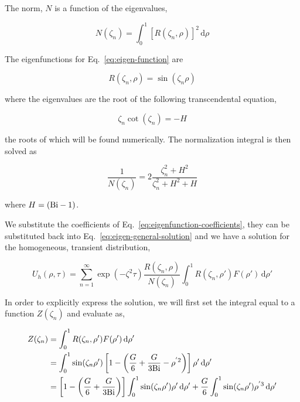 The norm, $N$ is a function of the eigenvalues,

\begin{equation}
    N(\zeta_n) = \int_0^1 \left[R(\zeta_n,\rho)\right]^2\,\mathrm{d}\rho
\end{equation}



The eigenfunctions for Eq.~\ref{eq:eigen-function} are

\begin{equation}
    R(\zeta_n,\rho) = \sin(\zeta_n \rho)
\end{equation}

where the eigenvalues are the root of the following transcendental equation,

\begin{equation}
    \zeta_n\cot(\zeta_n) = -H
\end{equation}

the roots of which will be found numerically. The normalization integral is then solved as

\begin{equation}
    \frac{1}{N(\zeta_n)} = 2\frac{\zeta_n^2 + H^2}{\zeta_n^2+H^2 + H}
\end{equation}

where $H = (\mathrm{Bi}-1)$. 

We substitute the coefficients of Eq.~\ref{eq:eigenfunction-coefficients}, they can be substituted back into Eq.~\ref{eq:eigen-general-solution} and we have a solution for the homogeneous, transient distribution,

\begin{equation}
    U_h(\rho,\tau) = \sum_{n=1}^\infty \exp(-\zeta^2 \tau) \frac{R(\zeta_n,\rho)}{N(\zeta_n)}\int_0^1 R(\zeta_n,\rho')F(\rho')\,\mathrm{d}\rho'
\end{equation}

In order to explicitly express the solution, we will first set the integral equal to a function $Z(\zeta_n)$ and evaluate as,

\begin{align}
    Z(\zeta_n) & = \int_0^1 R(\zeta_n,\rho')F(\rho')\,\mathrm{d}\rho' \nonumber\\
    & = \int_0^1\sin(\zeta_n\rho') \left[1 - \left(\frac{G}{6} + \frac{G}{3\mathrm{Bi}}-\rho^{'2}\right) \right]\rho'  \,\mathrm{d}\rho' \nonumber\\
    & =\left[1  - \left(\frac{G}{6} + \frac{G}{3\mathrm{Bi}}\right)\right]\int_0^1\sin(\zeta_n\rho')\rho' \,\mathrm{d}\rho' + \frac{G}{6}\int_0^1 \sin(\zeta_n\rho')\rho^{'3} \,\mathrm{d}\rho'
\end{align}


